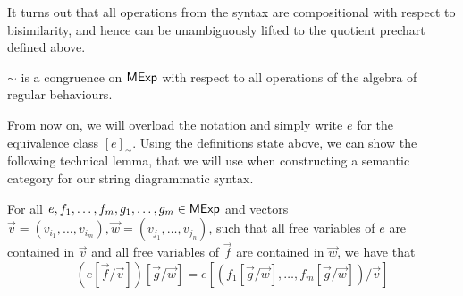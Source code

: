 It turns out that all operations from the syntax are compositional with respect to bisimilarity, and hence can be unambiguously lifted to the quotient prechart defined above.
\begin{lemma}\label{lem:congruence}
	$\sim$ is a congruence on $\mathsf{MExp}$ with respect to all operations of the algebra of regular behaviours.
\end{lemma}
From now on, we will overload the notation and simply write $e$ for the equivalence class $[e]_{\sim}$. Using the definitions state above, we can show the following technical lemma, that we will use when constructing a semantic category for our string diagrammatic syntax.
\begin{lemma}\label{lem:subst_lemma}
	For all $e, f_1, \dots, f_m, g_1, \dots, g_m \in \mathsf{MExp}$ and vectors $\vec{v}=(v_{i_1}, \dots, v_{i_m}), \vec{w}=(v_{j_1}, \dots, v_{j_n})$, such that all free variables of $e$ are contained in $\vec{v}$ and all free variables of $\vec{f}$ are contained in $\vec{w}$, we have that 
	$$
	(e[\vec{f}/ \vec{v}])[\vec{g}/\vec{w}] =e [(f_1[\vec{g}/\vec{w}], \dots, f_m[\vec{g}/\vec{w}])/\vec{v}] 
	$$
\end{lemma}
